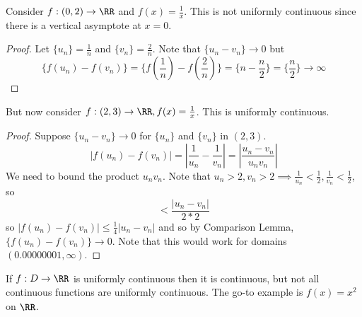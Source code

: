 \documentclass[12pt]{scrartcl}
\begin{document}
\begin{example}
  Consider $f: (0, 2) \to \RR$ and $f(x) = \frac{1}{x}$. This is not uniformly continuous
  since there is a vertical asymptote at $x=0$. 

  \begin{proof}
    Let $\{u_n\} = \frac{1}{n}$ and $\{v_n\} = \frac{2}{n}$. Note that $\{u_n - v_n\} \to 0$ but 
    \[\{f(u_n) - f(v_n)\} = \{f(\frac{1}{n}) - f(\frac{2}{n})\} = \{n - \frac{n}{2}\} = \{\frac{n}{2}\} \to \infty\]
  \end{proof}

  But now consider $f: (2, 3) \to \RR, f(x) = \frac{1}{x}$. This is uniformly continuous.

  \begin{proof}
    Suppose $\{u_n - v_n\} \to 0$ for $\{u_n\}$ and $\{v_n\}$ in $(2,3)$. 
    \[|f(u_n) - f(v_n)| = |\frac{1}{u_n} - \frac{1}{v_n}| = |\frac{u_n - v_n}{u_n v_n}|\]
    We need to bound the product $u_nv_n$. Note that $u_n > 2, v_n > 2 \implies \frac{1}{u_n} < \frac{1}{2}, \frac{1}{v_n} < \frac{1}{2}$, 
    so 
    \[< \frac{|u_n - v_n|}{2 * 2}\]
    so $|f(u_n) - f(v_n)| \leq \frac{1}{4}|u_n - v_n|$ and so by Comparison Lemma, $\{f(u_n) - f(v_n)\} \to 0$.
    Note that this would work for domains $(0.00000001, \infty)$.
  \end{proof}
\end{example}

\begin{note}
  If $f: D \to \RR$ is uniformly continuous then it is continuous, but not all 
  continuous functions are uniformly continuous. The go-to example is 
  $f(x) = x^2$ on $\RR$.
\end{note}
\end{document}
